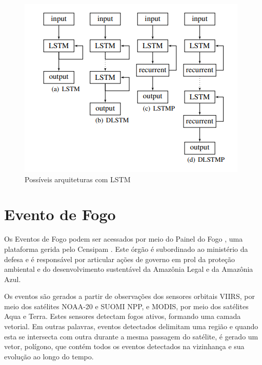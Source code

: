 \begin{figure}[htb]
	\centering
	\begin{minipage}{0.6\linewidth}
		\centering
		\includegraphics[width=\linewidth]{tg1/figuras/lstm_arch.png}
		\caption{Possíveis arquiteturas com LSTM
            \cite{lstm_fig}} \label{fig:lstmarch}
	\end{minipage}
\end{figure}




\section{Evento de Fogo}

Os Eventos de Fogo podem ser acessados por meio do Painel do Fogo \cite{painel-fogo}, uma plataforma gerida pelo Censipam \cite{censipam}. Este órgão é subordinado ao ministério da defesa e é responsável por articular ações de governo em prol da proteção ambiental e do desenvolvimento sustentável da Amazônia Legal e da Amazônia Azul.

Os eventos são gerados a partir de observações dos sensores orbitais VIIRS, por meio dos satélites NOAA-20 e SUOMI NPP, e MODIS, por meio dos satélites Aqua e Terra. Estes sensores detectam fogos ativos, formando uma camada vetorial. Em outras palavras, eventos detectados delimitam uma região e quando esta se intersecta com outra durante a mesma passagem do satélite, é gerado um vetor, polígono, que contém todos os eventos detectados na vizinhança e sua evolução ao longo do tempo.


